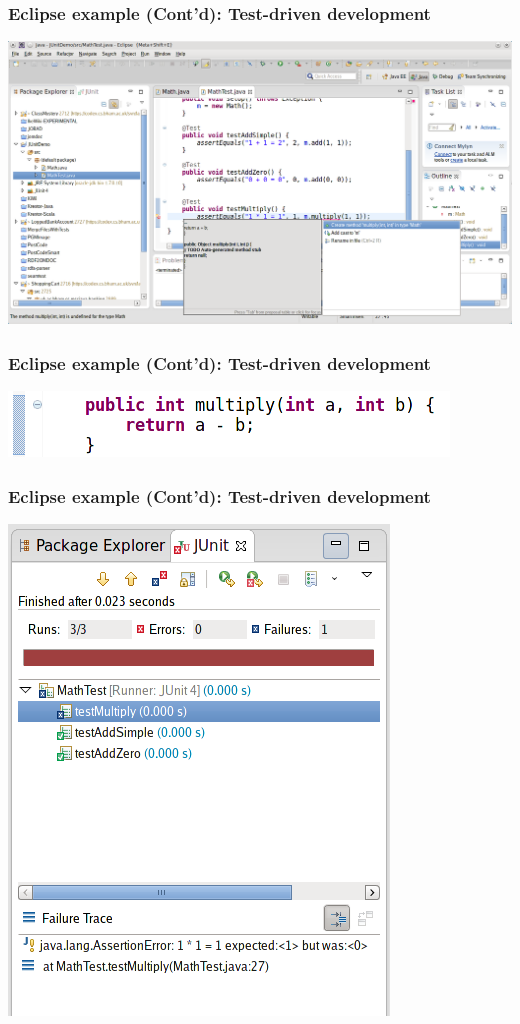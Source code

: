 \documentclass{beamer}
\begin{document}
\begin{frame}
\frametitle{Eclipse example (Cont'd): Test-driven development}
\label{sec-21}

\includegraphics[width=\textwidth]{./eclipse-junit-10-tdd-generate-code.png}
\end{frame}
\begin{frame}
\frametitle{Eclipse example (Cont'd): Test-driven development}
\label{sec-22}

\includegraphics[width=\textwidth]{./eclipse-junit-11-tdd-wrong-implementation.png}
\end{frame}

\begin{frame}
\frametitle{Eclipse example (Cont'd): Test-driven development}
\label{sec-23}

\includegraphics[width=.65\textwidth]{./eclipse-junit-12-tdd-test-failed.png}
\end{frame}
\end{document}
